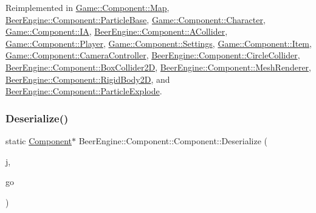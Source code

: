 Reimplemented in \mbox{\hyperlink{class_game_1_1_component_1_1_map_a5f4f196675adfac9690cc2009734d516}{Game\+::\+Component\+::\+Map}}, \mbox{\hyperlink{class_beer_engine_1_1_component_1_1_particle_base_a227b7fe0edab6df4b6c15f4b22bed7ae}{Beer\+Engine\+::\+Component\+::\+Particle\+Base}}, \mbox{\hyperlink{class_game_1_1_component_1_1_character_adb7763de218329815eb32867c3e4c152}{Game\+::\+Component\+::\+Character}}, \mbox{\hyperlink{class_game_1_1_component_1_1_i_a_a81f34676232065d85961d84be1268e6f}{Game\+::\+Component\+::\+IA}}, \mbox{\hyperlink{class_beer_engine_1_1_component_1_1_a_collider_ac6bad21e0cfe7f95c431b9a7a59c550c}{Beer\+Engine\+::\+Component\+::\+A\+Collider}}, \mbox{\hyperlink{class_game_1_1_component_1_1_player_a448003673bc03c81447887b9a6d38084}{Game\+::\+Component\+::\+Player}}, \mbox{\hyperlink{class_game_1_1_component_1_1_settings_ae9edc71830f43d318f8dbcedce2d8bf9}{Game\+::\+Component\+::\+Settings}}, \mbox{\hyperlink{class_game_1_1_component_1_1_item_a3a9cb5ba936a644f23976d9c9e9bbdce}{Game\+::\+Component\+::\+Item}}, \mbox{\hyperlink{class_game_1_1_component_1_1_camera_controller_a8076e01593ef38a83c708854906abb3b}{Game\+::\+Component\+::\+Camera\+Controller}}, \mbox{\hyperlink{class_beer_engine_1_1_component_1_1_circle_collider_a25651d52d7b584deb7f82b09037124d5}{Beer\+Engine\+::\+Component\+::\+Circle\+Collider}}, \mbox{\hyperlink{class_beer_engine_1_1_component_1_1_box_collider2_d_ab7de4fc1ab97576308f9f5bb76098a54}{Beer\+Engine\+::\+Component\+::\+Box\+Collider2D}}, \mbox{\hyperlink{class_beer_engine_1_1_component_1_1_mesh_renderer_a19b2d1dd25274ea7af898af2bc305a7b}{Beer\+Engine\+::\+Component\+::\+Mesh\+Renderer}}, \mbox{\hyperlink{class_beer_engine_1_1_component_1_1_rigid_body2_d_ae070289cdf3c6fde105671d41ee8315a}{Beer\+Engine\+::\+Component\+::\+Rigid\+Body2D}}, and \mbox{\hyperlink{class_beer_engine_1_1_component_1_1_particle_explode_ad79e74129dd1cd7f20e0575a9ffdffc3}{Beer\+Engine\+::\+Component\+::\+Particle\+Explode}}.

\mbox{\label{class_beer_engine_1_1_component_1_1_component_a9d24810dfc25e70d8a1a9d59fdf518a4}} 
\subsubsection{\texorpdfstring{Deserialize()}{Deserialize()}}
{\footnotesize\ttfamily static \mbox{\hyperlink{class_beer_engine_1_1_component_1_1_component}{Component}}$\ast$ Beer\+Engine\+::\+Component\+::\+Component\+::\+Deserialize (\begin{DoxyParamCaption}\item[{const nlohmann\+::json \&}]{j,  }\item[{\mbox{\hyperlink{class_beer_engine_1_1_game_object}{Game\+Object}} $\ast$}]{go }\end{DoxyParamCaption})\hspace{0.3cm}{\ttfamily [static]}}

